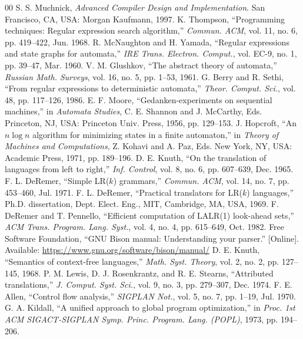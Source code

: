 \documentclass[conference]{IEEEtran}
\begin{document}
\begin{thebibliography}{00}
 S. S. Muchnick, \emph{Advanced Compiler Design and Implementation}. San Francisco, CA, USA: Morgan Kaufmann, 1997.
 K. Thompson, ``Programming techniques: Regular expression search algorithm,'' \emph{Commun. ACM}, vol. 11, no. 6, pp. 419--422, Jun. 1968.
 R. McNaughton and H. Yamada, ``Regular expressions and state graphs for automata,'' \emph{IRE Trans. Electron. Comput.}, vol. EC-9, no. 1, pp. 39--47, Mar. 1960.
 V. M. Glushkov, ``The abstract theory of automata,'' \emph{Russian Math. Surveys}, vol. 16, no. 5, pp. 1--53, 1961.
 G. Berry and R. Sethi, ``From regular expressions to deterministic automata,'' \emph{Theor. Comput. Sci.}, vol. 48, pp. 117--126, 1986.
 E. F. Moore, ``Gedanken-experiments on sequential machines,'' in \emph{Automata Studies}, C. E. Shannon and J. McCarthy, Eds. Princeton, NJ, USA: Princeton Univ. Press, 1956, pp. 129--153.
 J. Hopcroft, ``An $n \log n$ algorithm for minimizing states in a finite automaton,'' in \emph{Theory of Machines and Computations}, Z. Kohavi and A. Paz, Eds. New York, NY, USA: Academic Press, 1971, pp. 189--196.
 D. E. Knuth, ``On the translation of languages from left to right,'' \emph{Inf. Control}, vol. 8, no. 6, pp. 607--639, Dec. 1965.
 F. L. DeRemer, ``Simple LR($k$) grammars,'' \emph{Commun. ACM}, vol. 14, no. 7, pp. 453--460, Jul. 1971.
 F. L. DeRemer, ``Practical translators for LR($k$) languages,'' Ph.D. dissertation, Dept. Elect. Eng., MIT, Cambridge, MA, USA, 1969.
 F. DeRemer and T. Pennello, ``Efficient computation of LALR(1) look-ahead sets,'' \emph{ACM Trans. Program. Lang. Syst.}, vol. 4, no. 4, pp. 615--649, Oct. 1982.
 Free Software Foundation, ``GNU Bison manual: Understanding your parser.'' [Online]. Available: \url{https://www.gnu.org/software/bison/manual/}
 D. E. Knuth, ``Semantics of context-free languages,'' \emph{Math. Syst. Theory}, vol. 2, no. 2, pp. 127--145, 1968.
 P. M. Lewis, D. J. Rosenkrantz, and R. E. Stearns, ``Attributed translations,'' \emph{J. Comput. Syst. Sci.}, vol. 9, no. 3, pp. 279--307, Dec. 1974.
 F. E. Allen, ``Control flow analysis,'' \emph{SIGPLAN Not.}, vol. 5, no. 7, pp. 1--19, Jul. 1970.
 G. A. Kildall, ``A unified approach to global program optimization,'' in \emph{Proc. 1st ACM SIGACT-SIGPLAN Symp. Princ. Program. Lang. (POPL)}, 1973, pp. 194--206.

\end{thebibliography}
\end{document}
